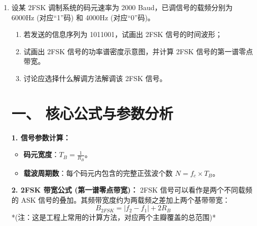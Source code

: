 \documentclass[a4paper,11pt]{ctexart}
\begin{document}
\begin{enumerate}[label=\textbf{7-\arabic*}]
\begin{center}
\begin{tikzpicture}[x=1.5cm, y=0.6cm]
    \end{tikzpicture}
    \end{center}
    
    \textbf{波形特点观察：}
    \begin{itemize}
        \item \textbf{OOK}：有载波表示“1”，无载波表示“0”，包络起伏大。
        \item \textbf{2PSK}：振幅恒定，但在码元切换处（如 1$\to$0 或 0$\to$1）相位发生 $180^\circ$ 跳变。
        \item \textbf{2DPSK}：波形与 2PSK 类似，但相位跳变的位置取决于“原数据是否为 1”。例如第 1 个码元数据为 1，则 2DPSK 波形相对于参考相位发生了翻转。
    \end{itemize}

    \item 设某 2FSK 调制系统的码元速率为 2000 Baud，已调信号的载频分别为 6000Hz (对应“1”码) 和 4000Hz (对应“0”码)。
    \begin{enumerate}
        \item 若发送的信息序列为 1011001，试画出 2FSK 信号的时间波形；
        \item 试画出 2FSK 信号的功率谱密度示意图，并计算 2FSK 信号的第一谱零点带宽。
        \item 讨论应选择什么解调方法解调该 2FSK 信号。
    \end{enumerate}
\begin{tcolorbox}[colback=white, colframe=blue!50!black, title=\textbf{题目解答：7-2 2FSK 系统的波形、带宽与解调}]

    \section*{一、 核心公式与参数分析}
    
    \textbf{1. 信号参数计算：}
    \begin{itemize}
        \item \textbf{码元宽度}：$T_B = \frac{1}{R_B}$。
        \item \textbf{载波周期数}：每个码元内包含的完整正弦波个数 $N = f_c \times T_B$。
    \end{itemize}
    
    \textbf{2. 2FSK 带宽公式 (第一谱零点带宽)：}
    2FSK 信号可以看作是两个不同载频的 ASK 信号的叠加。其频带宽度约为两载频之差加上两个基带带宽：
    \begin{equation}
        B_{2FSK} = |f_2 - f_1| + 2R_B
    \end{equation}
    *(注：这是工程上常用的计算方法，对应两个主瓣覆盖的总范围)*
    

\end{tcolorbox}
\end{enumerate}
\end{document}
